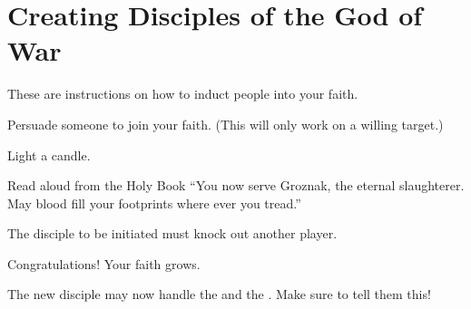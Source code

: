 \documentclass[green]{guildcamp2}
\begin{document}
\name{\gBaptism{}}

\section{Creating Disciples of the God of War}
These are instructions on how to induct people into your faith.

\begin{enum}[Requirements]
	\item {\iHolyBook{}}
	\item {\iCFungus{}}
	\item {\iCandle{}}
\end{enum}

\begin{enum}[Directions]
	\item Persuade someone to join your faith. (This will only work on a willing target.)
	\item Light a candle.
	\item Read aloud from the Holy Book ``You now serve Groznak, the eternal slaughterer. May blood fill your footprints where ever you tread.''
	\item The disciple to be initiated must knock out another player.
\end{enum}
	
Congratulations! Your faith grows.

The new disciple may now handle the \iHolyBook{} and the \iDagger{}. Make sure to tell them this!
\end{document}
